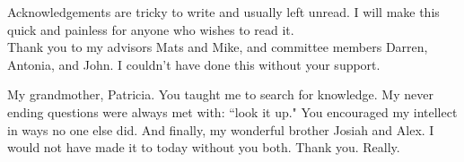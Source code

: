 
Acknowledgements are tricky to write and usually left unread. I will make this quick and painless for anyone who wishes to read it. \\

Thank you to my advisors Mats and Mike, and committee members Darren, Antonia, and John. I couldn't have done this without your support.

My grandmother, Patricia. You taught me to search for knowledge.  My never ending questions were always met with: ``look it up." You encouraged my intellect in ways no one else did. And finally, my wonderful brother Josiah and Alex. I would not have made it to today without you both. Thank you. Really. 

